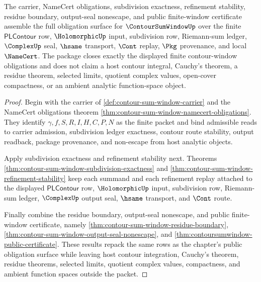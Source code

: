 \begin{theorem}
\label{thm:contour-sum-window-obligation-closure-package}
The carrier, NameCert obligations, subdivision exactness, refinement stability, residue boundary, output-seal nonescape, and public finite-window certificate assemble the full obligation surface for $\ContourSumWindowUp$ over the finite $\mathsf{PLContour}$ row, $\HolomorphicUp$ input, subdivision row, Riemann-sum ledger, $\ComplexUp$ seal, $\hsame$ transport, $\Cont$ replay, $\Pkg$ provenance, and local $\NameCert$. The package closes exactly the displayed finite contour-window obligations and does not claim a host contour integral, Cauchy's theorem, a residue theorem, selected limits, quotient complex values, open-cover compactness, or an ambient analytic function-space object.
\end{theorem}
\begin{proof}
Begin with the carrier of \autoref{def:contour-sum-window-carrier} and the NameCert obligations theorem \autoref{thm:contour-sum-window-namecert-obligations}. They identify $\gamma,f,S,R,I,H,C,P,N$ as the finite packet and bind admissible reads to carrier admission, subdivision ledger exactness, contour route stability, output readback, package provenance, and non-escape from host analytic objects.

Apply subdivision exactness and refinement stability next. Theorems \autoref{thm:contour-sum-window-subdivision-exactness} and \autoref{thm:contour-sum-window-refinement-stability} keep each summand and each refinement replay attached to the displayed $\mathsf{PLContour}$ row, $\HolomorphicUp$ input, subdivision row, Riemann-sum ledger, $\ComplexUp$ output seal, $\hsame$ transport, and $\Cont$ route.

Finally combine the residue boundary, output-seal nonescape, and public finite-window certificate, namely \autoref{thm:contour-sum-window-residue-boundary}, \autoref{thm:contour-sum-window-output-seal-nonescape}, and \autoref{thm:contoursumwindow-public-certificate}. These results repack the same rows as the chapter's public obligation surface while leaving host contour integration, Cauchy's theorem, residue theorems, selected limits, quotient complex values, compactness, and ambient function spaces outside the packet.
\end{proof}


